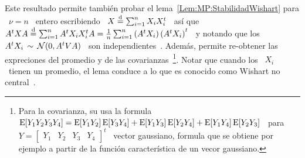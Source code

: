 Este resultado  permite tambi\'en probar  el lema~\ref{Lem:MP:StabilidadWishart}
para \  $\nu = n$  \ entero  escribiendo \ $X  \stackrel{\mathrm{d}}{=} \sum_{i=1}^n X_i  X_i^t$ \
as\'i que \ $A^t X A \stackrel{\mathrm{d}}{=}  \sum_{i=1}^n A^t X_i X_i^t A = \frac1n \sum_{i=1}^n
\left( A^t X_i \right) \left( A^t X_i  \right)^t$ \ y notando que los \ $A^t X_i
\, \sim \, \mathcal{N}(0, A^t V A)$ \ son independientes~\cite{Seb04}.  Adem\'as, permite
re-obtener las  expreciones del promedio y de  las covarianzas~\footnote{Para la
  covarianza, su usa la formula \ $\operatorname{E}[Y_1 Y_2 Y_3 Y_4] = \operatorname{E}[Y_1 Y_2]\operatorname{E}[Y_3
  Y_4]  + \operatorname{E}[Y_1 Y_3]\operatorname{E}[Y_2  Y_4] +  \operatorname{E}[Y_1 Y_4]\operatorname{E}[Y_2  Y_3]$ \  para $Y
  = \begin{bmatrix} Y_1  & Y_2 & Y_3 & Y_4  \end{bmatrix}^t$ \ vector gaussiano,
  formula que se  obtiene por ejemplo a partir  de la funci\'on caracter\'istica
  de un vecor gaussiano.}. Notar que cuando los \ $X_i$ \ tienen un promedio, el
lema conduce a lo que es conocido como Wishart no central~\cite{And03, Seb04}.

